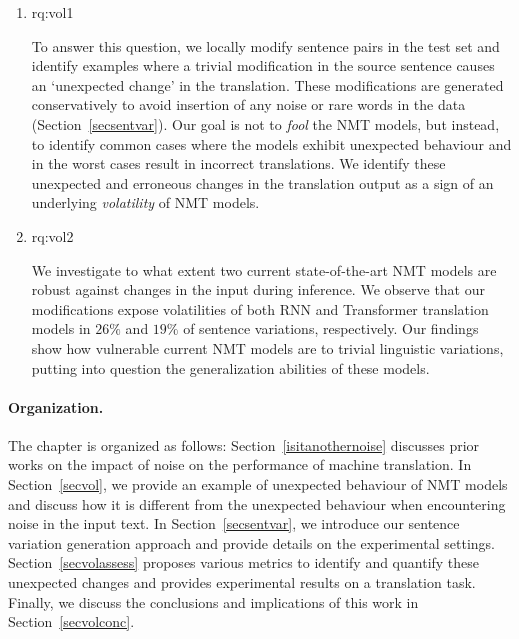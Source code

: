 \begin{enumerate}[label=\textbf{RQ3.\arabic* },wide = 0pt, leftmargin=2em]
\setlength\itemsep{1em}
 \setcounter{enumi}{2}
\item \acl{rq:vol1}

\medskip

\noindent To answer this question, we locally modify sentence pairs in the test set and identify examples where a trivial modification in the source sentence causes an `unexpected change' in the translation.
These modifications are generated conservatively to avoid insertion of any noise or rare words in the data (Section~\ref{secsentvar}). 
Our goal is not to \textit{fool} the NMT models, but instead, to identify common cases where the models exhibit unexpected behaviour and in the worst cases result in incorrect translations. 
We identify these unexpected and erroneous changes in the translation output as a sign of an underlying \textit{volatility} of NMT models. 

\item \acl{rq:vol2}

\medskip

\noindent We investigate to what extent two current state-of-the-art NMT models are robust against changes in the input during inference.
We observe that our modifications expose volatilities of both RNN and Transformer translation models in $26\%$ and $19\%$ of sentence variations, respectively.
Our findings show how vulnerable current NMT models are to trivial linguistic variations, putting into question the generalization abilities of these models. 

\end{enumerate}

\paragraph{Organization.} The chapter is organized as follows: 
Section~\ref{isitanothernoise} discusses prior works on the impact of noise on the performance of machine translation.
In Section~\ref{secvol}, we provide an example of unexpected behaviour of NMT models and discuss how it is different from the unexpected behaviour when encountering noise in the input text. 
In Section~\ref{secsentvar}, we introduce our sentence variation generation approach and provide details on the experimental settings.
Section~\ref{secvolassess} proposes various metrics to identify and quantify these unexpected changes and provides experimental results on a translation task.
Finally, we discuss the conclusions and implications of this work in Section~\ref{secvolconc}. 

